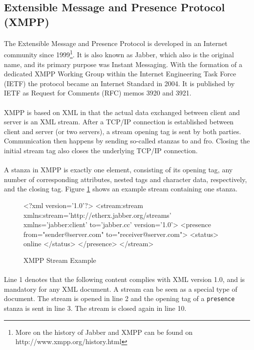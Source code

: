 \subsection{Extensible Message and Presence Protocol (XMPP)}
\label{sec:xmpp}
\paragraph{}
The Extensible Message and Presence Protocol is developed in an Internet community since 1999\footnote{More on the history of Jabber and XMPP can be found on http://www.xmpp.org/\-history.html}. It is also known as Jabber, which also is the original name, and its primary purpose was Instant Messaging. With the formation of a dedicated XMPP Working Group within the Internet Engineering Task Force (IETF) the protocol became an Internet Standard in 2004. It is published by IETF as Request for Comments (RFC) memos 3920 and 3921.
\paragraph{}
XMPP is based on XML in that the actual data exchanged between client and server is an XML stream. After a TCP/IP connection is established between client and server (or two servers), a stream opening tag is sent by both parties. Communication then happens by sending so-called stanzas to and fro. Closing the initial stream tag also closes the underlying TCP/IP connection.
\paragraph{}
A stanza in XMPP is exactly one element, consisting of its opening tag, any number of corresponding attributes, nested tags and character data, respectively, and the closing tag. Figure \ref{fig:streamExample} shows an example stream containing one stanza.

\begin{figure}[H]
\begin{listing}{1}
<?xml version='1.0'?>
<stream:stream 
      xmlns:stream='http://etherx.jabber.org/streams' 
      xmlns='jabber:client' to='jabber.cc' version='1.0'>
  <presence from="sender@server.com" to="receiver@server.com">
    <status>
      online
    </status>
  </presence>
</stream>
\end{listing}
\caption{XMPP Stream Example}
\label{fig:streamExample}
\end{figure}

\paragraph{}
Line 1 denotes that the following content complies with XML version 1.0, and is mandatory for any XML document. A stream can be seen as a special type of document. The stream is opened in line 2 and the opening tag of a \texttt{presence} stanza is sent in line 3. The stream is closed again in line 10.
